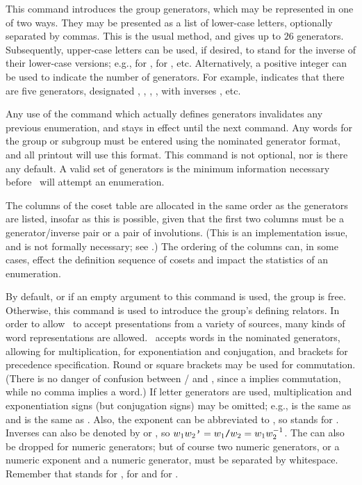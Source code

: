 \quad{}

This command introduces the group generators, which may be represented in
  one of two ways.
They may be presented as a list of lower-case letters, optionally
  separated by commas.
This is the usual method, and gives up to $26$ generators.
Subsequently, upper-case letters can be used, if desired, to stand for the
  inverse of their lower-case versions; 
  e.g.,  for ,  for , etc.
Alternatively, a positive integer can be used to indicate the number of
  generators.
For example,  indicates that there are five generators, 
  designated , , ,  \amp {}, with
  inverses , etc.

Any use of the  command which actually defines generators
  invalidates any previous enumeration, and stays in effect until the next
   command.
Any words for the group or subgroup must be entered using the nominated
  generator format, and all printout will use this format.
%
This command is not optional, nor is there any default.
A valid set of generators is the minimum information necessary before
  \ace\ will attempt an enumeration.

The columns of the coset table are allocated in the same order as the 
  generators are listed, insofar as this is possible, given that the first
  two columns must be a generator/inverse pair or a pair of involutions.
(This is an implementation issue, and is not formally necessary; see
  \cite{Bee}.)
The ordering of the columns can, in some cases, effect the definition
  sequence of cosets and impact the statistics of an enumeration.

\quad{}

By default, or if an empty argument to this command is used, the group
  is free.
Otherwise, this command is used to introduce the group's defining
  relators.
In order to allow \ace\ to accept presentations from a variety of
  sources, many kinds of word representations are allowed. 
\ace\ accepts words in the nominated generators, allowing \ttt{*} for
  multiplication, \ttt{\^{}} for exponentiation and conjugation, and
  brackets for precedence specification. 
Round or square brackets may be used for commutation. 
(There is no danger of confusion between \ttt{[a,b]}/ and
  , since a \ttt{,} implies commutation, while no comma implies a
  word.)
If letter generators are used, multiplication and exponentiation signs
  (but  conjugation signs) may be omitted; e.g.,  is the
  same as  and  is the same as .
Also, the exponent  can be abbreviated to \ttt{-},
  so  stands for .
Inverses can also be denoted by  or \ttt{/}, so
  $w_1w_2\texttt{'} = w_1\texttt{/}w_2 = w_1w^{-1}_2$\kern-1.5pt.
The \ttt{*} can also be dropped for numeric generators; but of course two
  numeric generators, or a numeric exponent and a numeric generator, must
  be separated by whitespace. 
Remember that  stands for ,  for
   and \ttt{[a,b]} \amp \ttt{[a,b,c]} for  \amp
  \ttt{[[a,b],c]}.


